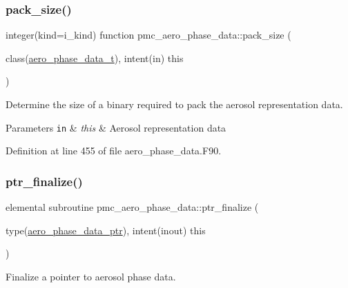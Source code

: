 \subsubsection{\texorpdfstring{pack\+\_\+size()}{pack\_size()}}
{\footnotesize\ttfamily integer(kind=i\+\_\+kind) function pmc\+\_\+aero\+\_\+phase\+\_\+data\+::pack\+\_\+size (\begin{DoxyParamCaption}\item[{class(\mbox{\hyperlink{structpmc__aero__phase__data_1_1aero__phase__data__t}{aero\+\_\+phase\+\_\+data\+\_\+t}}), intent(in)}]{this }\end{DoxyParamCaption})\hspace{0.3cm}{\ttfamily [private]}}



Determine the size of a binary required to pack the aerosol representation data. 


\begin{DoxyParams}[1]{Parameters}
\mbox{\tt in}  & {\em this} & Aerosol representation data \\
\hline
\end{DoxyParams}


Definition at line 455 of file aero\+\_\+phase\+\_\+data.\+F90.

\mbox{\label{namespacepmc__aero__phase__data_a4359879599442b607e51b52cab95fab2}} 
\subsubsection{\texorpdfstring{ptr\+\_\+finalize()}{ptr\_finalize()}}
{\footnotesize\ttfamily elemental subroutine pmc\+\_\+aero\+\_\+phase\+\_\+data\+::ptr\+\_\+finalize (\begin{DoxyParamCaption}\item[{type(\mbox{\hyperlink{structpmc__aero__phase__data_1_1aero__phase__data__ptr}{aero\+\_\+phase\+\_\+data\+\_\+ptr}}), intent(inout)}]{this }\end{DoxyParamCaption})\hspace{0.3cm}{\ttfamily [private]}}



Finalize a pointer to aerosol phase data. 


